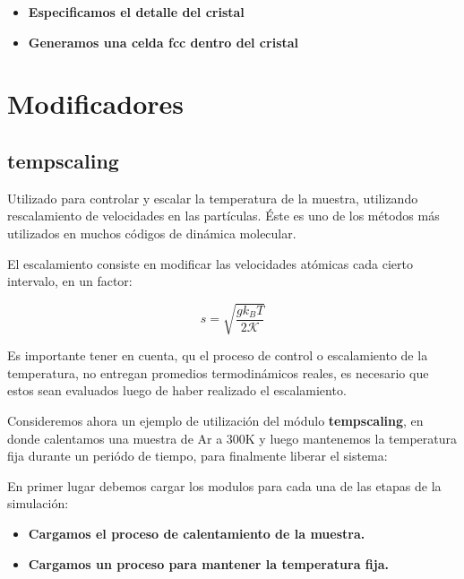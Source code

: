 \begin{itemize}
 \item \textbf{Especificamos el detalle del cristal}
 \item \textbf{Generamos una celda  fcc dentro del cristal}
\end{itemize}

\section{Modificadores}
\subsection{tempscaling}

Utilizado para controlar y escalar la temperatura de la muestra, utilizando rescalamiento de velocidades en las part\'iculas. \'Este es uno de los m\'etodos m\'as utilizados en muchos c\'odigos de din\'amica molecular.

El escalamiento consiste en modificar las velocidades at\'omicas cada cierto intervalo, en un factor:

$$s=\sqrt{\frac{gk_BT}{2\mathcal{K}}}$$

Es importante tener en cuenta, qu el proceso de control o escalamiento de la temperatura, no entregan promedios termodin\'amicos reales, es necesario que estos sean evaluados luego de haber realizado el escalamiento.

Consideremos ahora un ejemplo de utilizaci\'on del m\'odulo \textbf{tempscaling}, en donde calentamos una muestra de Ar a 300K y luego mantenemos la temperatura fija durante un peri\'odo de tiempo, para finalmente liberar el sistema:

En primer lugar debemos cargar los modulos para cada una de las etapas de la simulaci\'on:

\begin{itemize}
 \item \textbf{Cargamos el proceso de calentamiento de la muestra.}
 \item \textbf{Cargamos un proceso para mantener la temperatura fija.}
\end{itemize}

